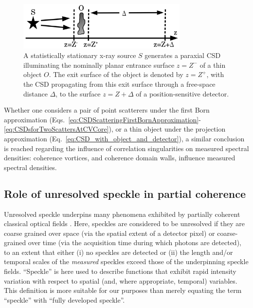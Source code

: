 \documentclass[%
 reprint,
 amsmath,amssymb,
 aps,
]{revtex4-1}
\begin{document}
\begin{figure}
\includegraphics[width=8.5cm]{Figures/ImagingWithCoherenceVortex.png}
\caption{A statistically stationary x-ray source $S$ generates a paraxial CSD illuminating the nominally planar entrance surface $z=Z^-$ of a thin object $O$.  The exit surface of the object is denoted by $z=Z^+$, with the CSD propagating from this exit surface through a free-space distance $\Delta$, to the surface $z=Z+\Delta$ of a position-sensitive detector.}
\label{fig:ImagingWithCoherenceVortex}
\end{figure}

Whether one considers a pair of point scatterers under the first Born approximation (Eqs.~\ref{eq:CSDScatteringFirstBornApproximation}-\ref{eq:CSDsforTwoScattersAtCVCore}), or a thin object under the projection approximation (Eq.~\ref{eq:CSD_with_object_and_detector}), a similar conclusion is reached regarding the influence of correlation singularities on measured spectral densities: coherence vortices, and coherence domain walls, influence measured spectral densities.  

\subsection{Role of unresolved speckle in partial coherence}\label{subsec:Discussion-part-2}

Unresolved speckle underpins many phenomena exhibited by partially coherent classical optical fields \cite{Nugent2003,paganin_book,Nesterets2008}.  Here, speckles are considered to be unresolved if they are coarse grained over space (via the spatial extent of a detector pixel) or coarse-grained over time (via the acquisition time during which photons are detected), to an extent that either (i) no speckles are detected or (ii) the length and/or temporal scales of the {\em measured} speckles exceed those of the underpinning speckle fields.  ``Speckle'' is here used to describe functions that exhibit rapid intensity variation with respect to spatial (and, where appropriate, temporal) variables. This definition is more suitable for our purposes than merely equating the term ``speckle'' with ``fully developed speckle''. 
\end{document}
